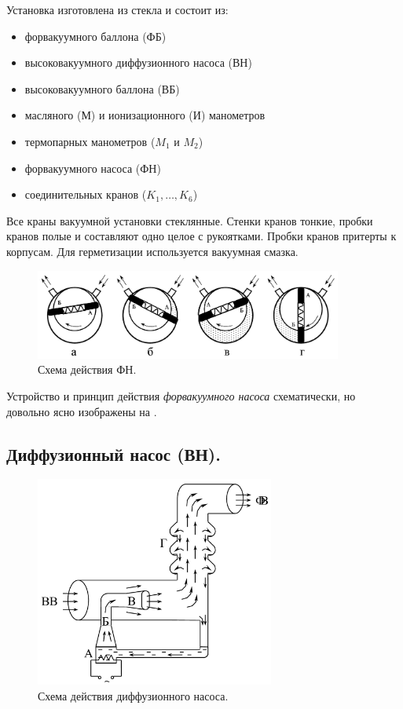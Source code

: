 \documentclass[a4paper,12pt]{article}
\begin{document}
Установка изготовлена из стекла и состоит из:
\begin{itemize}
  \item форвакуумного баллона (ФБ)
  \item высоковакуумного диффузионного насоса (ВН)
  \item высоковакуумного баллона (ВБ)
  \item масляного (М) и ионизационного (И) манометров
  \item термопарных манометров ($M_1$ и $M_2$)
  \item форвакуумного насоса (ФН)
  \item соединительных кранов ($K_1, \ldots, K_6$)
\end{itemize}

Все краны вакуумной установки стеклянные. Стенки кранов тонкие, пробки кранов полые и составляют одно целое с рукоятками.
Пробки кранов притерты к корпусам. Для герметизации используется вакуумная смазка.

\begin{figure} [H]
  \begin{center}
    \includegraphics[width=0.9\textwidth]{data/ФН_принцип_работы.png}
  \end{center}
  \caption{Схема действия ФН.\label{fig:2}}
\end{figure}

Устройство и принцип действия \textit{форвакуумного насоса} схематически, но довольно ясно изображены на .

\subsection{Диффузионный насос (ВН).}

\begin{figure} [H]
  \begin{center}
    \includegraphics[width=0.7\textwidth]{data/ВН_принцип_работы.png}
  \end{center}
  \caption{Схема действия диффузионного насоса.\label{fig:3}}
\end{figure}
\end{document}
